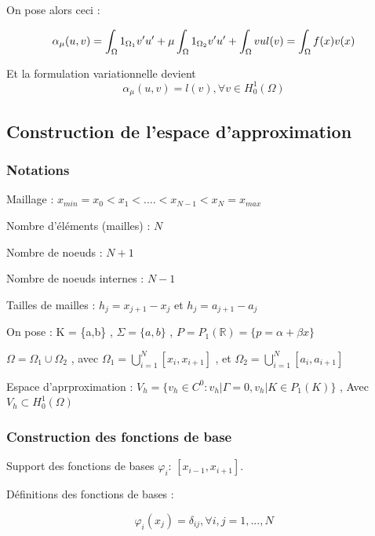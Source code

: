 \documentclass[12pt]{article}
\begin{document}
On pose alors ceci :

$$
\alpha _ {\mu}(u,v) 
= \int_{\Omega} 1_{\Omega_{1}}v'u' + \mu\int_{\Omega} 1_{\Omega_{2}} v'u' + \int_{\Omega} vu \\
l(v) = \int_{\Omega} f(x)v(x)
$$

Et la formulation variationnelle devient
$$
\alpha _ {\mu}(u,v) = l(v) ,  \forall v \in H_{0}^{1}(\Omega) 
$$



\subsection{Construction de l’espace d’approximation } 

\subsubsection{ Notations}

Maillage : $x_{min} = x_0 < x_1 < .... < x_{N-1} < x_N = x_{max}$ 

\noindent Nombre d'éléments (mailles) : $N$

\noindent Nombre de noeuds : $N+1$

\noindent Nombre de noeuds internes : $N-1$

\noindent Tailles de mailles : $h_j = x_{j+1} - x_j$   et   $h_j = a_{j+1} - a_j$

\noindent On pose :  K = \{a,b\} , $ \Sigma = \{a,b\} $ , $P = P_{1}(\mathbb{R}) = \{ p = \alpha + \beta x \}$


\noindent $\Omega = \Omega_{1} \cup \Omega_{2} $ , avec $\Omega_{1} = \bigcup _{i =1} ^{N} [x_{i},x_{i+1}] $ , et  $\Omega_{2} = \bigcup _{i =1} ^{N} [a_{i},a_{i+1}] $

\noindent Espace d'aprproximation : $ V_{h} = \{ v_{h} \in C^{0} : v_{h}|\Gamma = 0 , 
v_{h}|K \in P_{1}(K)\}$ , Avec $ V_{h}\subset H_{0}^{1}(\Omega)  $






\subsubsection{Construction des fonctions de base } 

Support des  fonctions de bases $\varphi_{i} $: $ [{x}_{i-1},{x}_{i+1}]$.

\noindent Définitions des fonctions de bases : 

$$
\varphi_{i} (x_{j}) = \delta_ {ij} , \forall i,j = 1,...,N
$$
\end{document}
